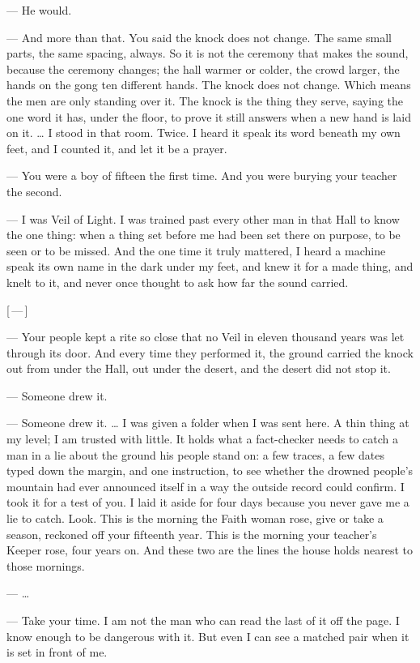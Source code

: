 \begin{room}
--- He would.

--- And more than that. You said the knock does not change. The same small parts, the same spacing, always. So it is not the ceremony that makes the sound, because the ceremony changes; the hall warmer or colder, the crowd larger, the hands on the gong ten different hands. The knock does not change. Which means the men are only standing over it. The knock is the thing they serve, saying the one word it has, under the floor, to prove it still answers when a new hand is laid on it. \ldots{} I stood in that room. Twice. I heard it speak its word beneath my own feet, and I counted it, and let it be a prayer.

--- You were a boy of fifteen the first time. And you were burying your teacher the second.

--- I was Veil of Light. I was trained past every other man in that Hall to know the one thing: when a thing set before me had been set there on purpose, to be seen or to be missed. And the one time it truly mattered, I heard a machine speak its own name in the dark under my feet, and knew it for a made thing, and knelt to it, and never once thought to ask how far the sound carried.

\centerline{[\,---\,]}

--- Your people kept a rite so close that no Veil in eleven thousand years was let through its door. And every time they performed it, the ground carried the knock out from under the Hall, out under the desert, and the desert did not stop it.

--- Someone drew it.

--- Someone drew it. \ldots{} I was given a folder when I was sent here. A thin thing at my level; I am trusted with little. It holds what a fact-checker needs to catch a man in a lie about the ground his people stand on: a few traces, a few dates typed down the margin, and one instruction, to see whether the drowned people's mountain had ever announced itself in a way the outside record could confirm. I took it for a test of you. I laid it aside for four days because you never gave me a lie to catch. Look. This is the morning the Faith woman rose, give or take a season, reckoned off your fifteenth year. This is the morning your teacher's Keeper rose, four years on. And these two are the lines the house holds nearest to those mornings.

--- \ldots{}

--- Take your time. I am not the man who can read the last of it off the page. I know enough to be dangerous with it. But even I can see a matched pair when it is set in front of me.


\end{room}
